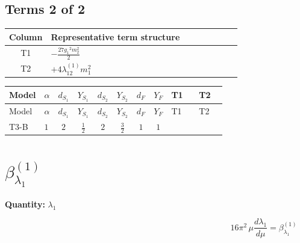 \documentclass[8pt]{article}
\begin{document}
\begin{landscape}
\subsection*{Terms 2 of 2}
\begin{center}
\begin{tabular}{@{}c >{\raggedright\arraybackslash}p{0.82\linewidth}@{}}
\toprule
Column & Representative term structure \\
\midrule
T1 & \(\displaystyle -\frac{27 {g_1}^2 {m_2^2}}{2}\) \\
\midrule
T2 & \(\displaystyle +4 {\lambda_{12}^{(1)}} {m_1^2}\) \\
\midrule
\bottomrule
\end{tabular}
\end{center}
\smallskip
\tiny
\begin{longtable}{@{}llcccccc >{\raggedright\arraybackslash}p{0.21\linewidth} >{\raggedright\arraybackslash}p{0.21\linewidth}@{}}
\toprule
Model & $\alpha$ & $d_{S_1}$ & $Y_{S_1}$ & $d_{S_2}$ & $Y_{S_2}$ & $d_F$ & $Y_F$ & T1 & T2 \\
\midrule
\endfirsthead
\toprule
Model & $\alpha$ & $d_{S_1}$ & $Y_{S_1}$ & $d_{S_2}$ & $Y_{S_2}$ & $d_F$ & $Y_F$ & T1 & T2 \\
\midrule
\endhead
T3-B & $1$ & $2$ & $\frac{1}{2}$ & $2$ & $\frac{3}{2}$ & $1$ & $1$ & \scriptsize\adjustbox{max width=\linewidth}{$\begin{gathered} -\frac{27 {g_1}^2 {m_2^2}}{2}\end{gathered}$} & \scriptsize\adjustbox{max width=\linewidth}{$\begin{gathered} +4 {\lambda_{12}^{(1)}} {m_1^2}\end{gathered}$} \\
\midrule
\bottomrule
\end{longtable}
\clearpage
\section*{$\beta_{\lambda_1}^{(1)}$}
\noindent\textbf{Quantity: }$\lambda_1$\par\smallskip
\[16\pi^2\,\mu\frac{d \lambda_1}{d\mu}=\beta_{\lambda_1}^{(1)}\]

\end{landscape}
\end{document}
